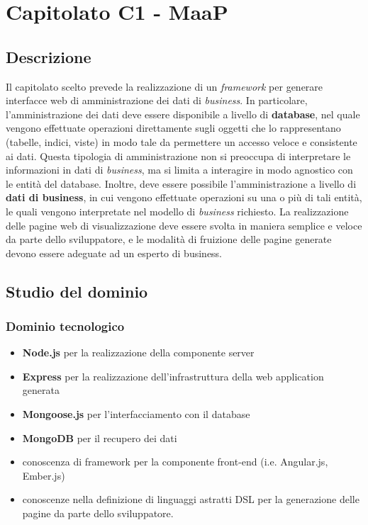 \section{Capitolato C1 - MaaP}

\subsection{Descrizione}
Il capitolato scelto prevede la realizzazione di un \emph{framework} per generare interfacce web di amministrazione dei dati di \emph{business}. In particolare, l'amministrazione dei dati deve essere disponibile a livello di \textbf{database}, nel quale vengono effettuate operazioni direttamente sugli oggetti che lo rappresentano (tabelle, indici, viste) in modo tale da permettere un accesso veloce e consistente ai dati. Questa tipologia di amministrazione non si preoccupa di interpretare le informazioni in dati di \emph{business}, ma si limita a interagire in modo agnostico con le entità del database. Inoltre, deve essere possibile l'amministrazione a livello di \textbf{dati di business}, in cui vengono effettuate operazioni su una o più di tali entità, le quali vengono interpretate nel modello di \emph{business} richiesto. La realizzazione delle pagine web di visualizzazione deve essere svolta in maniera semplice e veloce da parte dello sviluppatore, e le modalità di fruizione delle pagine generate devono essere adeguate ad un esperto di business.

\subsection{Studio del dominio}

	\subsubsection{Dominio tecnologico}
	\begin{itemize}
		\item \textbf{Node.js} per la realizzazione della componente server
		\item \textbf{Express} per la realizzazione dell’infrastruttura della web application generata
		\item \textbf{Mongoose.js} per l’interfacciamento con il database
		\item \textbf{MongoDB} per il recupero dei dati
		\item conoscenza di framework per la componente front-end (i.e. Angular.js, Ember.js)
		\item conoscenze nella definizione di linguaggi astratti DSL per la generazione delle pagine da parte dello sviluppatore.
	\end{itemize}

